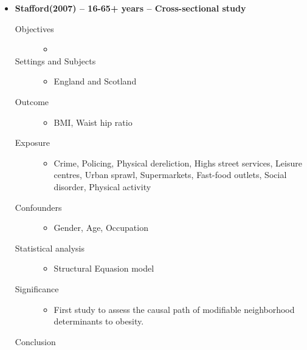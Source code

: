 \documentclass{article}
\begin{document}
\begin{itemize}
\item{\bf Stafford(2007) -- 16-65+ years -- Cross-sectional study}
		\begin{description}
			\item[Objectives] \mbox{}\par
				\begin{itemize} 
					\item 
				\end{itemize} 
			\item[Settings and Subjects] \mbox{}\par
				\begin{itemize} 
					\item England and Scotland 
				\end{itemize} 
			\item[Outcome] \mbox{}\par
				\begin{itemize} 
					\item BMI, Waist hip ratio 
				\end{itemize} 
			\item[Exposure] \mbox{}\par
				\begin{itemize} 
					\item Crime, Policing, Physical dereliction, Highs street services, Leisure centres, Urban sprawl, Supermarkets, Fast-food outlets, Social disorder, Physical activity 
				\end{itemize} 
			\item[Confounders] \mbox{}\par
				\begin{itemize} 
					\item Gender, Age, Occupation 
				\end{itemize} 
			\item[Statistical analysis] \mbox{}\par
				\begin{itemize} 
					\item Structural Equasion model
				\end{itemize} 
			\item[Significance]\mbox{}\par 
				\begin{itemize} 
					\item First study to assess the causal path of modifiable neighborhood determinants to obesity.
				\end{itemize} 
			\item[Conclusion]\mbox{}\par 

\end{description}
\end{itemize}
\end{document}
